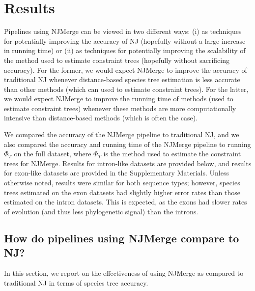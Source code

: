 \section{Results}
\label{sec:njmerge-results}
Pipelines using NJMerge can be viewed in two different ways:  
	(i) as techniques for potentially improving the accuracy of NJ (hopefully without a large increase in running time) or  
	(ii) as techniques for potentially improving the scalability of the method used to estimate constraint trees (hopefully without sacrificing accuracy).
For the former, we would expect NJMerge to improve the accuracy of traditional NJ whenever distance-based species tree estimation is less accurate than other methods (which can used to estimate constraint trees).
For the latter, we would expect NJMerge to improve the running time of methods (used to estimate constraint trees) whenever these methods are more computationally intensive than distance-based methods (which is often the case).

We compared the accuracy of the NJMerge pipeline to traditional NJ, and we also compared the accuracy and  running time of the NJMerge pipeline to running $\Phi_T$ on the full dataset, where $\Phi_T$ is the method used to estimate the constraint trees for NJMerge.
Results for intron-like datasets are provided below, and results for exon-like datasets are provided in the Supplementary Materials.
Unless otherwise noted, results were similar for both sequence types; however, species trees estimated on the exon datasets had slightly higher error rates than those estimated on the intron datasets.
This is expected, as the exons had slower rates of evolution (and thus less phylogenetic signal) than the introns.

\subsection{How do pipelines using NJMerge compare to NJ?}
In this section, we report on the effectiveness of using NJMerge as compared to traditional NJ in terms of species tree accuracy.

